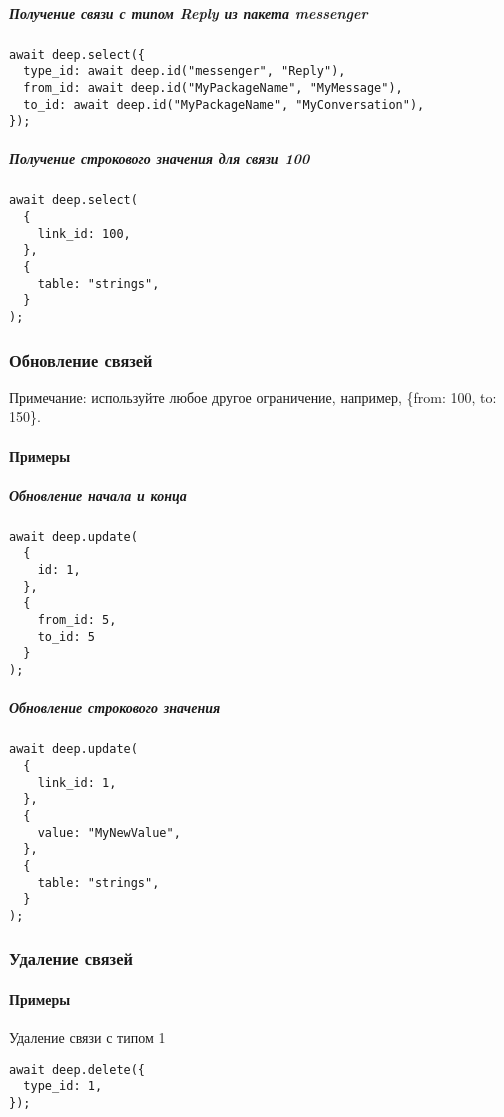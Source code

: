 \documentclass{article}
\begin{document}
\subparagraph{Получение связи с типом Reply из пакета messenger}
\leavevmode
\begin{lstlisting}
await deep.select({
  type_id: await deep.id("messenger", "Reply"),
  from_id: await deep.id("MyPackageName", "MyMessage"),
  to_id: await deep.id("MyPackageName", "MyConversation"),
});
\end{lstlisting}

\subparagraph{Получение строкового значения для связи 100}
\leavevmode
\begin{lstlisting}
await deep.select(
  {
    link_id: 100,
  },
  {
    table: "strings",
  }
);
\end{lstlisting}

\subsubsection{Обновление связей}

Примечание: используйте любое другое ограничение, например, \{from: 100, to:
150\}.

\paragraph{Примеры}

\subparagraph{Обновление начала и конца}
\leavevmode
\begin{lstlisting}
await deep.update(
  {
    id: 1,
  },
  {
    from_id: 5,
    to_id: 5
  }
);
\end{lstlisting}

\subparagraph{Обновление строкового значения}
\leavevmode
\begin{lstlisting}
await deep.update(
  {
    link_id: 1,
  },
  {
    value: "MyNewValue",
  },
  {
    table: "strings",
  }
);
\end{lstlisting}

\subsubsection{Удаление связей}

\paragraph{Примеры \\}

Удаление связи с типом 1

\leavevmode
\begin{lstlisting}
await deep.delete({
  type_id: 1,
});
\end{lstlisting}
\end{document}
